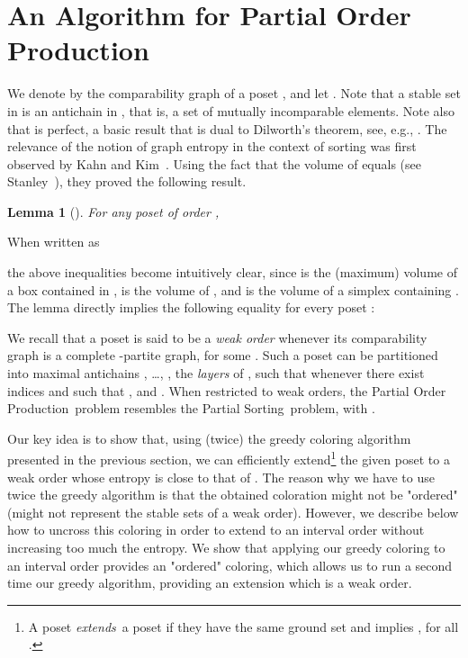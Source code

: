 \documentclass[12pt,oneside]{article}
\newtheorem{lemma}{Lemma}
\newcommand{\partsort}{{\sc Partial Order Production}}
\newcommand{\psort}{{\sc Partial Sorting}}
\begin{document}
\section{An Algorithm for Partial Order Production}
\label{sec-algorithm}

We denote by  the comparability graph of a poset , and let . Note that a stable set in  is an antichain in , that is, a set of mutually incomparable elements. Note also that  is perfect, a basic result that is dual to Dilworth's theorem, see, e.g., \cite{G04}. The relevance of the notion of graph entropy in the context of sorting was first observed by Kahn and Kim~\cite{KK95}. Using the fact that the volume of  equals  (see Stanley~\cite{S86}), they proved the following result.

\begin{lemma}[\hspace{-.01em}\cite{KK95}]
For any poset  of order ,

\end{lemma}

When written as

the above inequalities become intuitively clear, since  is the (maximum) volume of a box contained in ,  is the volume of , and  is the volume of a simplex containing . The lemma directly implies the following equality for every poset :


We recall that a poset is said to be a {\em weak order\/} whenever its comparability graph is a complete
-partite graph, for some . Such a poset  can be partitioned into  maximal
antichains , \ldots, , the {\em layers\/} of , such that  whenever there exist indices 
and  such that ,  and . When restricted to weak orders, the \partsort\ problem
resembles the \psort\ problem, with .

Our key idea is to show that, using (twice) the greedy coloring algorithm presented in the previous section, we can efficiently extend\footnote{A poset  {\em extends\,} a poset  if
they have the same ground set  and  implies , for all .}
the given poset  to a weak order  whose entropy is close to that of .  The reason why we have to use twice the greedy algorithm is that the obtained coloration might not be "ordered" (might not represent the stable sets of a weak order).  However, we describe below how to uncross this coloring in order to extend  to an interval order without increasing too much the entropy.  We show that applying our greedy coloring to an interval order provides an "ordered" coloring, which allows us to run a second time our greedy algorithm, providing an extension which is a weak order.
\end{document}
